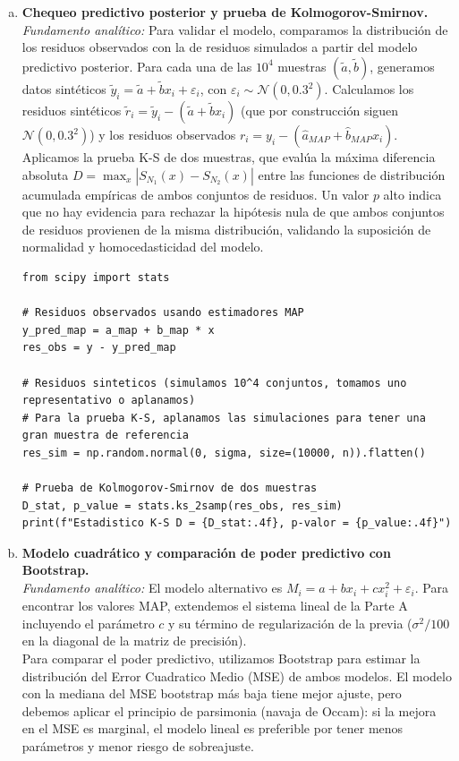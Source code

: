 \documentclass[a4paper]{article}
\begin{document}
\begin{enumerate}[a)]
\item \textbf{Chequeo predictivo posterior y prueba de Kolmogorov-Smirnov.} \\
\textit{Fundamento analítico:} Para validar el modelo, comparamos la distribución de los residuos observados con la de residuos simulados a partir del modelo predictivo posterior. Para cada una de las $10^4$ muestras $(\tilde{a}, \tilde{b})$, generamos datos sintéticos $\tilde{y}_i = \tilde{a} + \tilde{b}x_i + \varepsilon_i$, con $\varepsilon_i \sim \mathcal{N}(0, 0.3^2)$. Calculamos los residuos sintéticos $\tilde{r}_i = \tilde{y}_i - (\tilde{a} + \tilde{b}x_i)$ (que por construcción siguen $\mathcal{N}(0, 0.3^2)$) y los residuos observados $r_i = y_i - (\hat{a}_{MAP} + \hat{b}_{MAP}x_i)$. \\
Aplicamos la prueba K-S de dos muestras, que evalúa la máxima diferencia absoluta $D = \max_x |S_{N_1}(x) - S_{N_2}(x)|$ entre las funciones de distribución acumulada empíricas de ambos conjuntos de residuos. Un valor $p$ alto indica que no hay evidencia para rechazar la hipótesis nula de que ambos conjuntos de residuos provienen de la misma distribución, validando la suposición de normalidad y homocedasticidad del modelo.

\begin{lstlisting}
from scipy import stats

# Residuos observados usando estimadores MAP
y_pred_map = a_map + b_map * x
res_obs = y - y_pred_map

# Residuos sinteticos (simulamos 10^4 conjuntos, tomamos uno representativo o aplanamos)
# Para la prueba K-S, aplanamos las simulaciones para tener una gran muestra de referencia
res_sim = np.random.normal(0, sigma, size=(10000, n)).flatten()

# Prueba de Kolmogorov-Smirnov de dos muestras
D_stat, p_value = stats.ks_2samp(res_obs, res_sim)
print(f"Estadistico K-S D = {D_stat:.4f}, p-valor = {p_value:.4f}")
\end{lstlisting}

\item \textbf{Modelo cuadrático y comparación de poder predictivo con Bootstrap.} \\
\textit{Fundamento analítico:} El modelo alternativo es $M_i = a + bx_i + cx_i^2 + \varepsilon_i$. Para encontrar los valores MAP, extendemos el sistema lineal de la Parte A incluyendo el parámetro $c$ y su término de regularización de la previa ($\sigma^2/100$ en la diagonal de la matriz de precisión). \\
Para comparar el poder predictivo, utilizamos Bootstrap para estimar la distribución del Error Cuadratico Medio (MSE) de ambos modelos. El modelo con la mediana del MSE bootstrap más baja tiene mejor ajuste, pero debemos aplicar el principio de parsimonia (navaja de Occam): si la mejora en el MSE es marginal, el modelo lineal es preferible por tener menos parámetros y menor riesgo de sobreajuste.


\end{enumerate}
\end{document}

